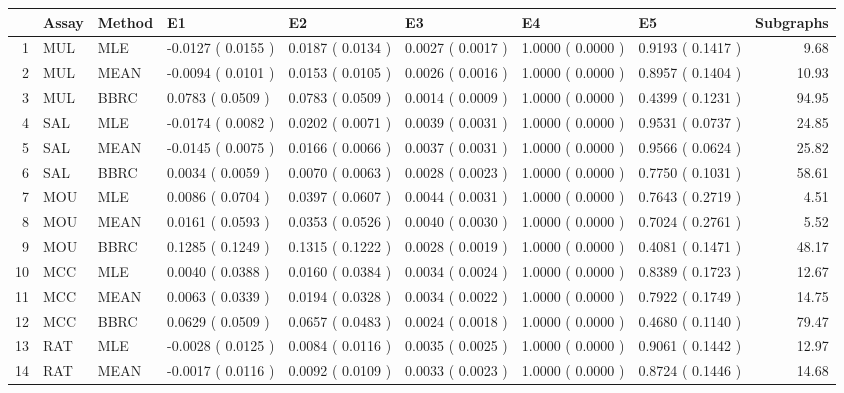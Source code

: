 \begin{table}[t]
\begin{center}
\begin{tabular}{rlllllllr}
  \hline
 & Assay & Method & E1 & E2 & E3 & E4 & E5 & Subgraphs \\ 
  \hline
1 & MUL & MLE & -0.0127 ( 0.0155 ) & 0.0187 ( 0.0134 ) & 0.0027 ( 0.0017 ) & 1.0000 ( 0.0000 ) & 0.9193 ( 0.1417 ) & 9.68 \\ 
  2 & MUL & MEAN & -0.0094 ( 0.0101 ) & 0.0153 ( 0.0105 ) & 0.0026 ( 0.0016 ) & 1.0000 ( 0.0000 ) & 0.8957 ( 0.1404 ) & 10.93 \\ 
  3 & MUL & BBRC & 0.0783 ( 0.0509 ) & 0.0783 ( 0.0509 ) & 0.0014 ( 0.0009 ) & 1.0000 ( 0.0000 ) & 0.4399 ( 0.1231 ) & 94.95 \\ 
  4 & SAL & MLE & -0.0174 ( 0.0082 ) & 0.0202 ( 0.0071 ) & 0.0039 ( 0.0031 ) & 1.0000 ( 0.0000 ) & 0.9531 ( 0.0737 ) & 24.85 \\ 
  5 & SAL & MEAN & -0.0145 ( 0.0075 ) & 0.0166 ( 0.0066 ) & 0.0037 ( 0.0031 ) & 1.0000 ( 0.0000 ) & 0.9566 ( 0.0624 ) & 25.82 \\ 
  6 & SAL & BBRC & 0.0034 ( 0.0059 ) & 0.0070 ( 0.0063 ) & 0.0028 ( 0.0023 ) & 1.0000 ( 0.0000 ) & 0.7750 ( 0.1031 ) & 58.61 \\ 
  7 & MOU & MLE & 0.0086 ( 0.0704 ) & 0.0397 ( 0.0607 ) & 0.0044 ( 0.0031 ) & 1.0000 ( 0.0000 ) & 0.7643 ( 0.2719 ) & 4.51 \\ 
  8 & MOU & MEAN & 0.0161 ( 0.0593 ) & 0.0353 ( 0.0526 ) & 0.0040 ( 0.0030 ) & 1.0000 ( 0.0000 ) & 0.7024 ( 0.2761 ) & 5.52 \\ 
  9 & MOU & BBRC & 0.1285 ( 0.1249 ) & 0.1315 ( 0.1222 ) & 0.0028 ( 0.0019 ) & 1.0000 ( 0.0000 ) & 0.4081 ( 0.1471 ) & 48.17 \\ 
  10 & MCC & MLE & 0.0040 ( 0.0388 ) & 0.0160 ( 0.0384 ) & 0.0034 ( 0.0024 ) & 1.0000 ( 0.0000 ) & 0.8389 ( 0.1723 ) & 12.67 \\ 
  11 & MCC & MEAN & 0.0063 ( 0.0339 ) & 0.0194 ( 0.0328 ) & 0.0034 ( 0.0022 ) & 1.0000 ( 0.0000 ) & 0.7922 ( 0.1749 ) & 14.75 \\ 
  12 & MCC & BBRC & 0.0629 ( 0.0509 ) & 0.0657 ( 0.0483 ) & 0.0024 ( 0.0018 ) & 1.0000 ( 0.0000 ) & 0.4680 ( 0.1140 ) & 79.47 \\ 
  13 & RAT & MLE & -0.0028 ( 0.0125 ) & 0.0084 ( 0.0116 ) & 0.0035 ( 0.0025 ) & 1.0000 ( 0.0000 ) & 0.9061 ( 0.1442 ) & 12.97 \\ 
  14 & RAT & MEAN & -0.0017 ( 0.0116 ) & 0.0092 ( 0.0109 ) & 0.0033 ( 0.0023 ) & 1.0000 ( 0.0000 ) & 0.8724 ( 0.1446 ) & 14.68 \\ 

\end{tabular}
\end{center}
\end{table}
